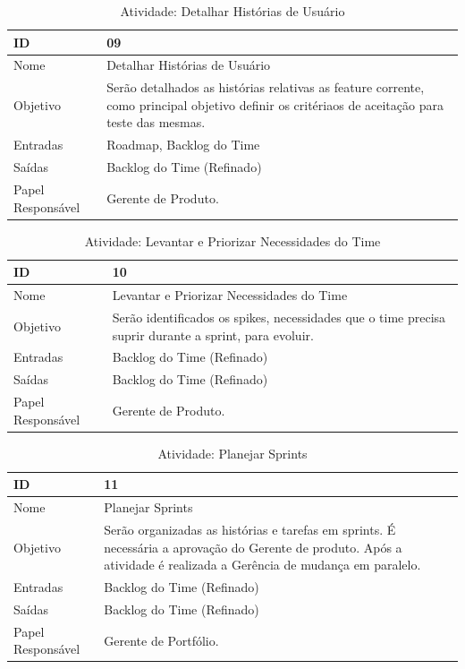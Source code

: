   \begin{table}[H]
    \centering
      \begin{tabular}{| m{5em} | m{10cm} |}
        \hline
        ID       & 09   \\ \hline
        Nome     & Detalhar Histórias de Usuário  \\ \hline
        Objetivo & Serão detalhados as histórias relativas as feature corrente, como principal objetivo definir os critériaos de aceitação para teste das mesmas.  \\ \hline
        Entradas & Roadmap, Backlog do Time\\ \hline
        Saídas   & Backlog do Time (Refinado) \\ \hline
        Papel Responsável   & Gerente de Produto. \\ \hline
      \end{tabular}
      \caption{Atividade: Detalhar Histórias de Usuário}
      \label{tabela:atividade9}
  \end{table}

  \begin{table}[H]
    \centering
      \begin{tabular}{| m{5em} | m{10cm} |}
        \hline
        ID       & 10   \\ \hline
        Nome     & Levantar e Priorizar Necessidades do Time  \\ \hline
        Objetivo & Serão identificados os spikes, necessidades que o time precisa suprir durante a sprint, para evoluir.  \\ \hline
        Entradas & Backlog do Time (Refinado)\\ \hline
        Saídas   & Backlog do Time (Refinado) \\ \hline
        Papel Responsável   & Gerente de Produto. \\ \hline
      \end{tabular}
      \caption{Atividade: Levantar e Priorizar Necessidades do Time}
      \label{tabela:atividade10}
  \end{table}

  \begin{table}[H]
    \centering
      \begin{tabular}{| m{5em} | m{10cm} |}
        \hline
        ID       & 11   \\ \hline
        Nome     & Planejar Sprints  \\ \hline
        Objetivo & Serão  organizadas as histórias e tarefas em sprints. É necessária a aprovação do Gerente de produto. Após a atividade é realizada a Gerência de mudança em paralelo.  \\ \hline
        Entradas & Backlog do Time (Refinado)\\ \hline
        Saídas   & Backlog do Time (Refinado) \\ \hline
        Papel Responsável   & Gerente de Portfólio. \\ \hline
      \end{tabular}
      \caption{Atividade: Planejar Sprints}
      \label{tabela:atividade11}
  \end{table}

